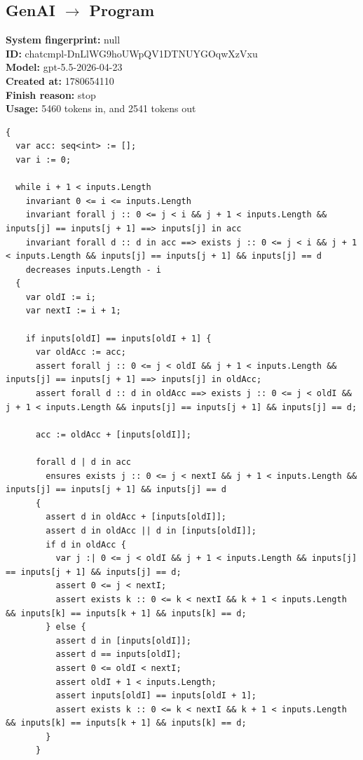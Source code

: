 \documentclass{article}
\begin{document}
\subsection*{GenAI $\rightarrow$ Program}
\textbf{System fingerprint: }null
\\\textbf{ID: }chatcmpl-DnLlWG9hoUWpQV1DTNUYGOqwXzVxu
\\\textbf{Model: }gpt-5.5-2026-04-23
\\\textbf{Created at: }1780654110
\\\textbf{Finish reason: }stop
\\\textbf{Usage: }5460 tokens in, and 2541 tokens out
\begin{lstlisting}
{
  var acc: seq<int> := [];
  var i := 0;

  while i + 1 < inputs.Length
    invariant 0 <= i <= inputs.Length
    invariant forall j :: 0 <= j < i && j + 1 < inputs.Length && inputs[j] == inputs[j + 1] ==> inputs[j] in acc
    invariant forall d :: d in acc ==> exists j :: 0 <= j < i && j + 1 < inputs.Length && inputs[j] == inputs[j + 1] && inputs[j] == d
    decreases inputs.Length - i
  {
    var oldI := i;
    var nextI := i + 1;

    if inputs[oldI] == inputs[oldI + 1] {
      var oldAcc := acc;
      assert forall j :: 0 <= j < oldI && j + 1 < inputs.Length && inputs[j] == inputs[j + 1] ==> inputs[j] in oldAcc;
      assert forall d :: d in oldAcc ==> exists j :: 0 <= j < oldI && j + 1 < inputs.Length && inputs[j] == inputs[j + 1] && inputs[j] == d;

      acc := oldAcc + [inputs[oldI]];

      forall d | d in acc
        ensures exists j :: 0 <= j < nextI && j + 1 < inputs.Length && inputs[j] == inputs[j + 1] && inputs[j] == d
      {
        assert d in oldAcc + [inputs[oldI]];
        assert d in oldAcc || d in [inputs[oldI]];
        if d in oldAcc {
          var j :| 0 <= j < oldI && j + 1 < inputs.Length && inputs[j] == inputs[j + 1] && inputs[j] == d;
          assert 0 <= j < nextI;
          assert exists k :: 0 <= k < nextI && k + 1 < inputs.Length && inputs[k] == inputs[k + 1] && inputs[k] == d;
        } else {
          assert d in [inputs[oldI]];
          assert d == inputs[oldI];
          assert 0 <= oldI < nextI;
          assert oldI + 1 < inputs.Length;
          assert inputs[oldI] == inputs[oldI + 1];
          assert exists k :: 0 <= k < nextI && k + 1 < inputs.Length && inputs[k] == inputs[k + 1] && inputs[k] == d;
        }
      }


\end{lstlisting}
\end{document}
